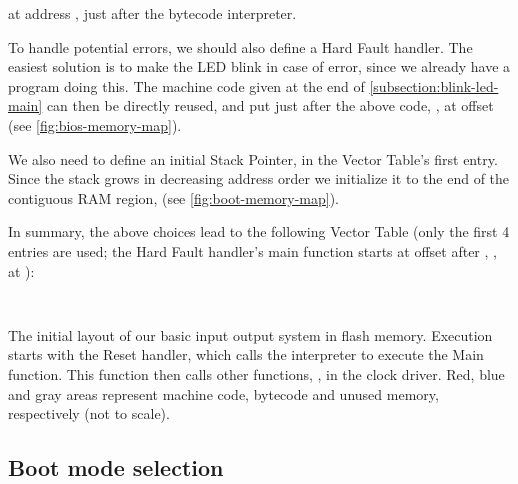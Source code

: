 \noindent at address , just after the bytecode
interpreter.

To handle potential errors, we should also define a Hard Fault handler. The
easiest solution is to make the LED blink in case of error, since we already
have a program doing this. The machine code given at the end of
\cref{subsection:blink-led-main} can then be directly reused, and put just
after the above code, \ie, at offset  (see
\cref{fig:bios-memory-map}).

We also need to define an initial Stack Pointer, in the Vector Table's first
entry. Since the stack grows in decreasing address order we initialize it to
the end of the contiguous RAM region,  (see
\cref{fig:boot-memory-map}).

In summary, the above choices lead to the following Vector Table (only the
first 4 entries are used; the Hard Fault handler's main function starts at
offset  after , \ie, at
):

\phantom{x}\hfill {\tt {} %
  }

\begin{Figure}
  

  \caption{The initial layout of our basic input output system in flash memory.
  Execution starts with the Reset handler, which calls the interpreter to
  execute the Main function. This function then calls other functions, \eg, in
  the clock driver. Red, blue and gray areas represent machine code, bytecode
  and unused memory, respectively (not to scale).}\label{fig:bios-memory-map}
\end{Figure}

\subsection{Boot mode selection}\label{subsection:boot-mode-selection}

